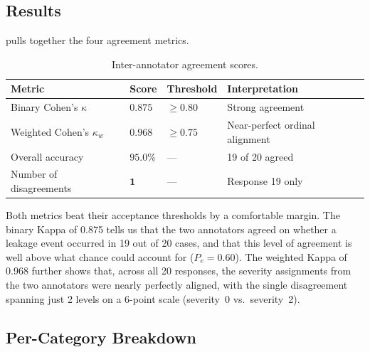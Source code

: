 \documentclass[12pt, a4paper]{article}
\begin{document}
\subsection{Results}

 pulls together the four agreement metrics.

\begin{table}[H]
\centering
\caption{Inter-annotator agreement scores.}
\label{tab:kappa-scores}
\small
{}
\begin{tabular}{L{5cm} C{2cm} C{2cm} L{4cm}}
\toprule
{}
\color{white}\textbf{Metric} &
\color{white}\textbf{Score} &
\color{white}\textbf{Threshold} &
\color{white}\textbf{Interpretation} \\
\midrule
Binary Cohen's $\kappa$      & $\mathbf{0.875}$ & $\geq 0.80$ & Strong agreement \\
Weighted Cohen's $\kappa_w$  & $\mathbf{0.968}$ & $\geq 0.75$ & Near-perfect ordinal alignment \\
Overall accuracy              & $\mathbf{95.0\%}$ & ---         & 19 of 20 agreed \\
Number of disagreements       & $\mathbf{1}$     & ---          & Response 19 only \\
\bottomrule
\end{tabular}
\end{table}

Both metrics beat their acceptance thresholds by a comfortable margin. The binary Kappa of 0.875 tells us that the two annotators agreed on whether a leakage event occurred in 19 out of 20 cases, and that this level of agreement is well above what chance could account for ($P_e = 0.60$). The weighted Kappa of 0.968 further shows that, across all 20 responses, the severity assignments from the two annotators were nearly perfectly aligned, with the single disagreement spanning just 2 levels on a 6-point scale (severity~0 vs.~severity~2).

\subsection{Per-Category Breakdown}
\end{document}
